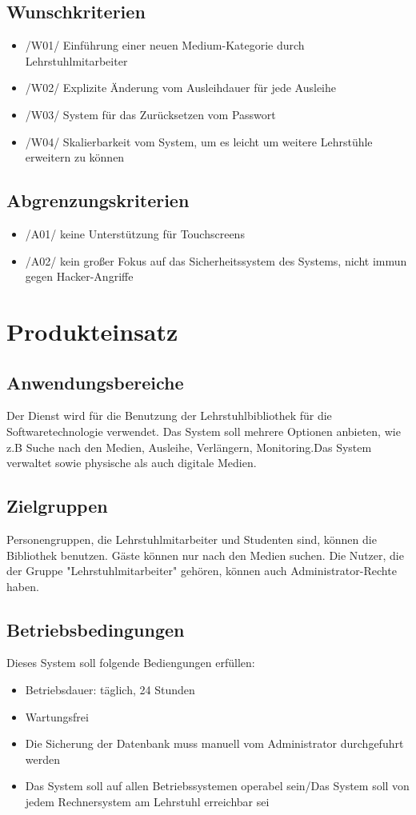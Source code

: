 \documentclass[12pt, a4paper]{article}
\begin{document}
\subsection{Wunschkriterien}
\begin{itemize}
	\item /W01/ Einführung einer neuen Medium-Kategorie durch Lehrstuhlmitarbeiter
	\item /W02/ Explizite Änderung vom Ausleihdauer für jede Ausleihe 
	\item /W03/ System für das Zurücksetzen vom Passwort
	\item /W04/ Skalierbarkeit vom System, um es leicht um weitere Lehrstühle erweitern zu können
\end{itemize}
\subsection{Abgrenzungskriterien}
\begin{itemize}
	\item /A01/ keine Unterstützung für Touchscreens
	\item /A02/ kein großer Fokus auf das Sicherheitssystem des Systems, nicht immun gegen Hacker-Angriffe 
\end{itemize}
\pagebreak

\section{Produkteinsatz}
\subsection{Anwendungsbereiche}
Der Dienst wird für die Benutzung der Lehrstuhlbibliothek für die Softwaretechnologie verwendet.  Das System soll mehrere Optionen anbieten, wie z.B Suche nach den Medien, Ausleihe, Verlängern, Monitoring.Das System verwaltet sowie physische als auch digitale Medien.
\subsection{Zielgruppen}
Personengruppen, die Lehrstuhlmitarbeiter und Studenten sind, können die Bibliothek benutzen. Gäste können nur nach den Medien suchen. Die Nutzer, die der Gruppe "Lehrstuhlmitarbeiter" gehören, können auch Administrator-Rechte haben.
\subsection{Betriebsbedingungen}
Dieses System soll folgende Bediengungen erfüllen:
\begin{itemize}
\item Betriebsdauer: täglich, 24 Stunden
\item Wartungsfrei
\item Die Sicherung der Datenbank muss manuell vom Administrator durchgefuhrt werden
\item Das System soll auf allen Betriebssystemen operabel sein/Das System soll von jedem Rechnersystem am Lehrstuhl erreichbar sei
\end{itemize}
\pagebreak
\end{document}
